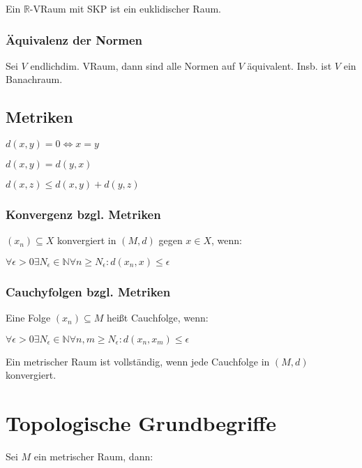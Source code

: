 Ein $\mathbb{R}$-VRaum mit SKP ist ein euklidischer Raum.

\subsubsection*{Äquivalenz der Normen}

Sei $V$ endlichdim. VRaum, dann sind alle Normen auf $V$ äquivalent. Insb. ist $V$ ein Banachraum.

\subsection*{Metriken}

\begin{description}[leftmargin=!,labelwidth=35mm]
	\item[Definitheit] $d(x, y) = 0 \Leftrightarrow x = y$
	\item[Symmetrie] $d(x, y) = d(y, x)$
	\item[Dreiecksungleichung] $d(x, z) \leq d(x, y) + d(y, z)$
\end{description}

\subsubsection*{Konvergenz bzgl. Metriken}

$(x_n) \subseteq X$ konvergiert in $(M, d)$ gegen $x \in X$, wenn:

$\forall \epsilon > 0 \exists N_\epsilon \in \mathbb{N} \forall n \geq N_\epsilon : d(x_n, x) \leq \epsilon$

\subsubsection*{Cauchyfolgen bzgl. Metriken}

Eine Folge $(x_n) \subseteq M$ heißt Cauchfolge, wenn:

$\forall \epsilon > 0 \exists N_\epsilon \in \mathbb{N} \forall n, m \geq N_\epsilon : d(x_n, x_m) \leq \epsilon$

Ein metrischer Raum ist vollständig, wenn jede Cauchfolge in $(M, d)$ konvergiert.

\section*{Topologische Grundbegriffe}

Sei $M$ ein metrischer Raum, dann:

